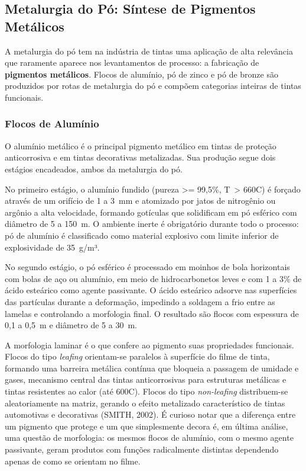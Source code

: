 \documentclass[
  12pt,
  a4paper,
  oneside,
  brazil,
  chapter=TITLE
]{article}
\begin{document}
\subsection{Metalurgia do Pó: Síntese de Pigmentos Metálicos}\label{metalurgia-po}

A metalurgia do pó tem na indústria de tintas uma aplicação de alta relevância
que raramente aparece nos levantamentos de processo: a fabricação de
\textbf{pigmentos metálicos}. Flocos de alumínio, pó de zinco e pó de bronze são
produzidos por rotas de metalurgia do pó e compõem categorias inteiras de tintas
funcionais.

\subsubsection{Flocos de Alumínio}\label{flocos-aluminio}

O alumínio metálico é o principal pigmento metálico em tintas de proteção
anticorrosiva e em tintas decorativas metalizadas. Sua produção segue dois
estágios encadeados, ambos da metalurgia do pó.

No primeiro estágio, o alumínio fundido (pureza \textgreater{}= 99,5\%, T~> 660\textdegree{}C) é forçado
através de um orifício de 1 a 3~mm e atomizado por jatos de nitrogênio ou
argônio a alta velocidade, formando gotículas que solidificam em pó esférico com
diâmetro de 5 a 150~\textmu m. O ambiente inerte é obrigatório durante todo o processo:
pó de alumínio é classificado como material explosivo com limite inferior de
explosividade de 35~g/m³.

No segundo estágio, o pó esférico é processado em moinhos de bola horizontais
com bolas de aço ou alumínio, em meio de hidrocarbonetos leves e com 1 a 3\% de
ácido esteárico como agente passivante. O ácido esteárico adsorve nas superfícies
das partículas durante a deformação, impedindo a soldagem a frio entre as lamelas
e controlando a morfologia final. O resultado são flocos com espessura de 0,1 a
0,5~\textmu m e diâmetro de 5 a 30~\textmu m.

A morfologia laminar é o que confere ao pigmento suas propriedades funcionais.
Flocos do tipo \textit{leafing} orientam-se paralelos à superfície do filme de
tinta, formando uma barreira metálica contínua que bloqueia a passagem de
umidade e gases, mecanismo central das tintas anticorrosivas para estruturas
metálicas e tintas resistentes ao calor (até 600\textdegree{}C). Flocos do tipo
\textit{non-leafing} distribuem-se aleatoriamente na matriz, gerando o efeito
metalizado característico de tintas automotivas e decorativas (SMITH, 2002). É
curioso notar que a diferença entre um pigmento que protege e um que simplesmente
decora é, em última análise, uma questão de morfologia: os mesmos flocos de
alumínio, com o mesmo agente passivante, geram produtos com funções radicalmente
distintas dependendo apenas de como se orientam no filme.
\end{document}
